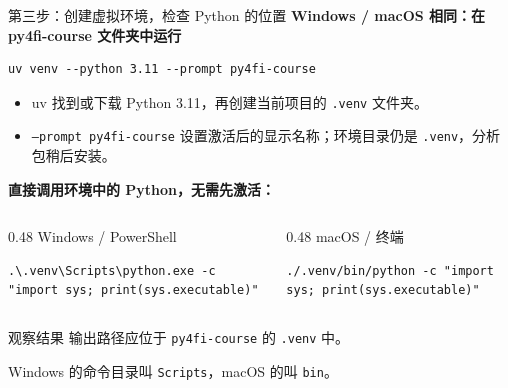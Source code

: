 \documentclass[9pt]{ctexbeamer}
\begin{document}
\begin{frame}[fragile]{第三步：创建虚拟环境，检查 Python 的位置}
  \textbf{Windows / macOS 相同：在 py4fi-course 文件夹中运行}
\begin{lstlisting}[language={},numbers=none]
uv venv --python 3.11 --prompt py4fi-course
\end{lstlisting}
  \begin{itemize}
    \item uv 找到或下载 Python 3.11，再创建当前项目的 \texttt{.venv} 文件夹。
    \item \texttt{--prompt py4fi-course} 设置激活后的显示名称；环境目录仍是 \texttt{.venv}，分析包稍后安装。
  \end{itemize}
  \textbf{直接调用环境中的 Python，无需先激活：}
  \begin{columns}[T,totalwidth=\textwidth]
    \begin{column}{0.48\textwidth}
      Windows / PowerShell
\begin{lstlisting}[language={},numbers=none,basicstyle=\ttfamily\scriptsize]
.\.venv\Scripts\python.exe -c "import sys; print(sys.executable)"
\end{lstlisting}
    \end{column}
    \begin{column}{0.48\textwidth}
      macOS / 终端
\begin{lstlisting}[language={},numbers=none,basicstyle=\ttfamily\scriptsize]
./.venv/bin/python -c "import sys; print(sys.executable)"
\end{lstlisting}
    \end{column}
  \end{columns}
  \begin{block}{观察结果}
    输出路径应位于 \texttt{py4fi-course} 的 \texttt{.venv} 中。\par
    Windows 的命令目录叫 \texttt{Scripts}，macOS 的叫 \texttt{bin}。
  \end{block}
\end{frame}
\end{document}
